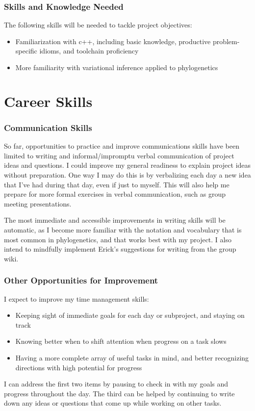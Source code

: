 \documentclass{paper}
\begin{document}
\subsubsection*{Skills and Knowledge Needed}
The following skills will be needed to tackle project objectives:
\begin{itemize}
    \item Familiarization with c++, including basic knowledge, productive problem-specific idioms, and toolchain proficiency
    \item More familiarity with variational inference applied to phylogenetics
\end{itemize}

\section*{Career Skills}

\subsubsection*{Communication Skills}
So far, opportunities to practice and improve communications skills have been limited to writing and informal/impromptu verbal communication of project ideas and questions.
I could improve my general readiness to explain project ideas without preparation.
One way I may do this is by verbalizing each day a new idea that I've had during that day, even if just to myself.
This will also help me prepare for more formal exercises in verbal communication, such as group meeting presentations.

The most immediate and accessible improvements in writing skills will be automatic, as I become more familiar with the notation and vocabulary that is most common in phylogenetics, and that works best with my project.
I also intend to mindfully implement Erick's suggestions for writing from the group wiki.

\subsubsection*{Other Opportunities for Improvement}
I expect to improve my time management skills:
\begin{itemize}
    \item Keeping sight of immediate goals for each day or subproject, and staying on track
    \item Knowing better when to shift attention when progress on a task slows
    \item Having a more complete array of useful tasks in mind, and better recognizing directions with high potential for progress
\end{itemize}
I can address the first two items by pausing to check in with my goals and progress throughout the day.
The third can be helped by continuing to write down any ideas or questions that come up while working on other tasks.
\end{document}
